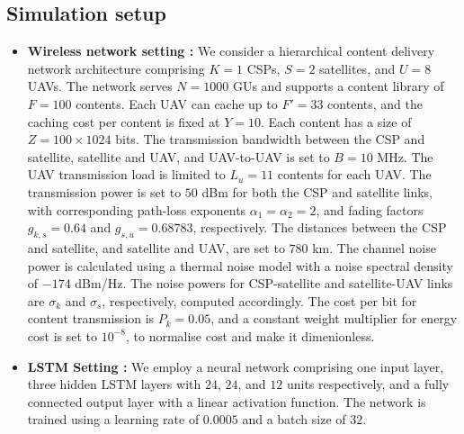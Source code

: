 \documentclass[journal]{IEEEtran}
\begin{document}
\subsection{Simulation setup}
\begin{itemize}
    \item \textbf{Wireless network setting :}
    We consider a hierarchical content delivery network architecture comprising $K = 1$ CSPs, $S = 2$ satellites, and $U = 8$ UAVs. The network serves $N = 1000$ GUs and supports a content library of $F = 100$ contents. Each UAV can cache up to $F' = 33$ contents, and the caching cost per content is fixed at $Y = 10$. Each content has a size of $Z = 100 \times 1024$ bits. The transmission bandwidth between the CSP and satellite, satellite and UAV, and UAV-to-UAV is set to $B = 10$ MHz. The UAV transmission load is limited to $L_u = 11$ contents for each UAV. The transmission power is set to $50$ dBm for both the CSP and satellite links, with corresponding path-loss exponents $\alpha_1 = \alpha_2 = 2$, and fading factors $g_{k,s} = 0.64$ and $g_{s,u} = 0.68783$, respectively. The distances between the CSP and satellite, and satellite and UAV, are set to $780$ km. The channel noise power is calculated using a thermal noise model with a noise spectral density of $-174$ dBm/Hz. The noise powers for CSP-satellite and satellite-UAV links are $\sigma_k$ and $\sigma_s$, respectively, computed accordingly. The cost per bit for content transmission is $P_k = 0.05$, and a constant weight multiplier for energy cost is set to $10^{-8}$, to normalise cost and make it dimenionless.
    \item \textbf{LSTM Setting :} We employ a neural network comprising one input layer, three hidden LSTM layers with $24$, $24$, and $12$ units respectively, and a fully connected output layer with a linear activation function. The network is trained using a learning rate of $0.0005$ and a batch size of $32$.


\end{itemize}
\end{document}

